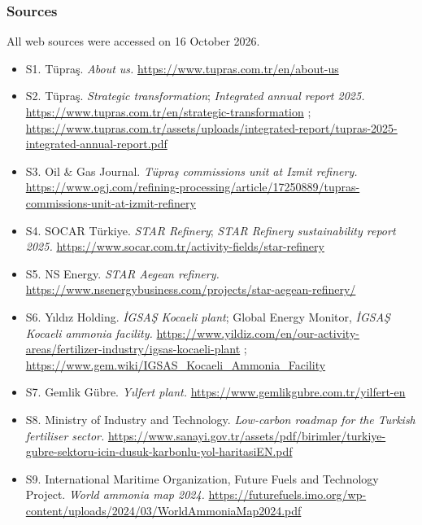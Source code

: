 \documentclass[11pt,a4paper]{article}
\begin{document}
\subsubsection{Sources}

All web sources were accessed on 16 October 2026.

\begin{itemize}\setlength\itemsep{1pt}

  \item S1. Tüpraş. \textit{About us.} \url{https://www.tupras.com.tr/en/about-us}

  \item S2. Tüpraş. \textit{Strategic transformation}; \textit{Integrated annual report 2025.} \url{https://www.tupras.com.tr/en/strategic-transformation} ; \url{https://www.tupras.com.tr/assets/uploads/integrated-report/tupras-2025-integrated-annual-report.pdf}

  \item S3. Oil \& Gas Journal. \textit{Tüpraş commissions unit at Izmit refinery.} \url{https://www.ogj.com/refining-processing/article/17250889/tupras-commissions-unit-at-izmit-refinery}

  \item S4. SOCAR Türkiye. \textit{STAR Refinery}; \textit{STAR Refinery sustainability report 2025.} \url{https://www.socar.com.tr/activity-fields/star-refinery}

  \item S5. NS Energy. \textit{STAR Aegean refinery.} \url{https://www.nsenergybusiness.com/projects/star-aegean-refinery/}

  \item S6. Yıldız Holding. \textit{İGSAŞ Kocaeli plant}; Global Energy Monitor, \textit{İGSAŞ Kocaeli ammonia facility.} \url{https://www.yildiz.com/en/our-activity-areas/fertilizer-industry/igsas-kocaeli-plant} ; \url{https://www.gem.wiki/IGSAS_Kocaeli_Ammonia_Facility}

  \item S7. Gemlik Gübre. \textit{Yılfert plant.} \url{https://www.gemlikgubre.com.tr/yilfert-en}

  \item S8. Ministry of Industry and Technology. \textit{Low-carbon roadmap for the Turkish fertiliser sector.} \url{https://www.sanayi.gov.tr/assets/pdf/birimler/turkiye-gubre-sektoru-icin-dusuk-karbonlu-yol-haritasiEN.pdf}

  \item S9. International Maritime Organization, Future Fuels and Technology Project. \textit{World ammonia map 2024.} \url{https://futurefuels.imo.org/wp-content/uploads/2024/03/WorldAmmoniaMap2024.pdf}


\end{itemize}
\end{document}
